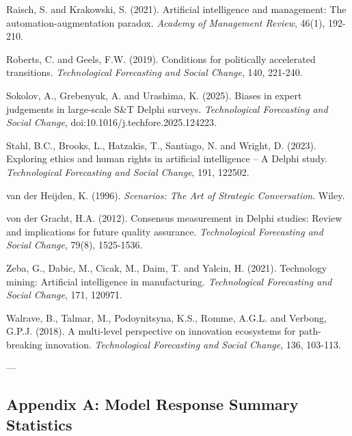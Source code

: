 \documentclass{article}
\begin{document}
Raisch, S. and Krakowski, S. (2021). Artificial intelligence and management: The automation-augmentation paradox. \textit{Academy of Management Review}, 46(1), 192-210.

Roberts, C. and Geels, F.W. (2019). Conditions for politically accelerated transitions. \textit{Technological Forecasting and Social Change}, 140, 221-240.

Sokolov, A., Grebenyuk, A. and Urashima, K. (2025). Biases in expert judgements in large-scale S\&T Delphi surveys. \textit{Technological Forecasting and Social Change}, doi:10.1016/j.techfore.2025.124223.

Stahl, B.C., Brooks, L., Hatzakis, T., Santiago, N. and Wright, D. (2023). Exploring ethics and human rights in artificial intelligence -- A Delphi study. \textit{Technological Forecasting and Social Change}, 191, 122502.

van der Heijden, K. (1996). \textit{Scenarios: The Art of Strategic Conversation}. Wiley.

von der Gracht, H.A. (2012). Consensus measurement in Delphi studies: Review and implications for future quality assurance. \textit{Technological Forecasting and Social Change}, 79(8), 1525-1536.

Zeba, G., Dabic, M., Cicak, M., Daim, T. and Yalcin, H. (2021). Technology mining: Artificial intelligence in manufacturing. \textit{Technological Forecasting and Social Change}, 171, 120971.

Walrave, B., Talmar, M., Podoynitsyna, K.S., Romme, A.G.L. and Verbong, G.P.J. (2018). A multi-level perspective on innovation ecosystems for path-breaking innovation. \textit{Technological Forecasting and Social Change}, 136, 103-113.

---


\subsection{Appendix A: Model Response Summary Statistics}
\label{sec:appendix_a_model_response_summary_statistics}
\end{document}
